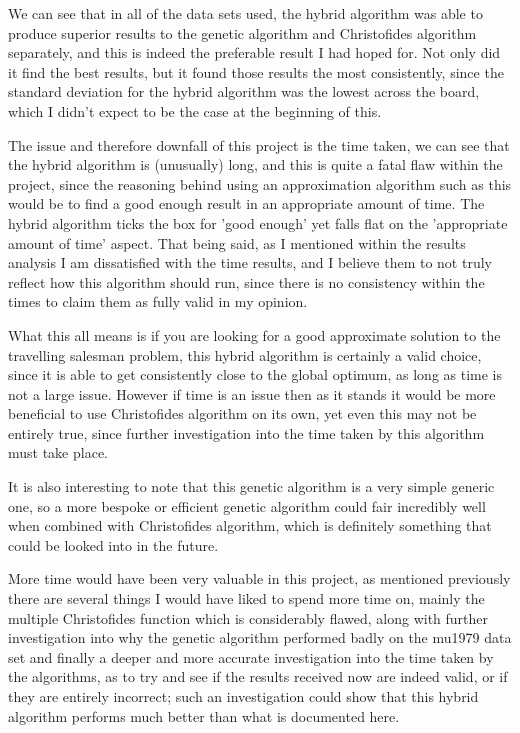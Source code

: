 \documentclass[11pt,a4paper,titlepage]{article}
\begin{document}
We can see that in all of the data sets used, the hybrid algorithm was able to produce superior results to the genetic algorithm and Christofides algorithm separately, and this is indeed the preferable result I had hoped for. Not only did it find the best results, but it found those results the most consistently, since the standard deviation for the hybrid algorithm was the lowest across the board, which I didn't expect to be the case at the beginning of this.

The issue and therefore downfall of this project is the time taken, we can see that the hybrid algorithm is (unusually) long, and this is quite a fatal flaw within the project, since the reasoning behind using an approximation algorithm such as this would be to find a good enough result in an appropriate amount of time. The hybrid algorithm ticks the box for 'good enough' yet falls flat on the 'appropriate amount of time' aspect. That being said, as I mentioned within the results analysis I am dissatisfied with the time results, and I believe them to not truly reflect how this algorithm should run, since there is no consistency within the times to claim them as fully valid in my opinion.

What this all means is if you are looking for a good approximate solution to the travelling salesman problem, this hybrid algorithm is certainly a valid choice, since it is able to get consistently close to the global optimum, as long as time is not a large issue. However if time is an issue then as it stands it would be more beneficial to use Christofides algorithm on its own, yet even this may not be entirely true, since further investigation into the time taken by this algorithm must take place.

It is also interesting to note that this genetic algorithm is a very simple generic one, so a more bespoke or efficient genetic algorithm could fair incredibly well when combined with Christofides algorithm, which is definitely something that could be looked into in the future.

More time would have been very valuable in this project, as mentioned previously there are several things I would have liked to spend more time on, mainly the multiple Christofides function which is considerably flawed, along with further investigation into why the genetic algorithm performed badly on the mu1979 data set and finally a deeper and more accurate investigation into the time taken by the algorithms, as to try and see if the results received now are indeed valid, or if they are entirely incorrect; such an investigation could show that this hybrid algorithm performs much better than what is documented here.
\end{document}
